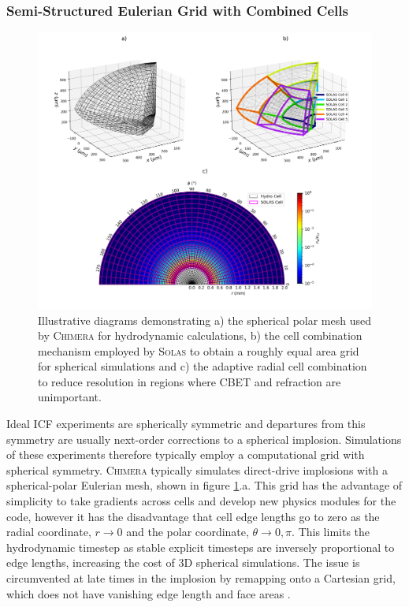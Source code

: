 \subsubsection{Semi-Structured Eulerian Grid with Combined Cells}

\begin{figure}[t!]
    \includegraphics[width=16cm]{Numerics/Images/solas_cells_3imagescombined.png}
    \centering
    \caption{Illustrative diagrams demonstrating a) the spherical polar mesh used by \textsc{Chimera} for hydrodynamic calculations, b) the cell combination mechanism employed by \textsc{Solas} to obtain a roughly equal area grid for spherical simulations and c) the adaptive radial cell combination to reduce resolution in regions where \ac{CBET} and refraction are unimportant.}
    \label{fig:SOLAS_combined_cells}
\end{figure}

Ideal \ac{ICF} experiments are spherically symmetric and departures from this symmetry are usually next-order corrections to a spherical implosion.
Simulations of these experiments therefore typically employ a computational grid with spherical symmetry.
\textsc{Chimera} typically simulates direct-drive implosions with a spherical-polar Eulerian mesh, shown in figure \ref{fig:SOLAS_combined_cells}.a.
This grid has the advantage of simplicity to take gradients across cells and develop new physics modules for the code, however it has the disadvantage that cell edge lengths go to zero as the radial coordinate, $r\rightarrow 0$ and the polar coordinate, $\theta\rightarrow 0,\pi$.
This limits the hydrodynamic timestep as stable explicit timesteps are inversely proportional to edge lengths, increasing the cost of 3D spherical simulations.
The issue is circumvented at late times in the implosion by remapping onto a Cartesian grid, which does not have vanishing edge length and face areas \cite{chittenden_signatures_2016}.

